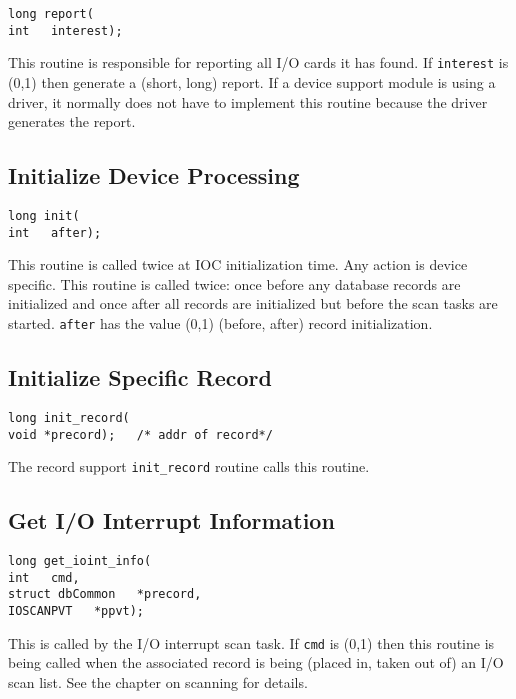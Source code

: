\begin{verbatim}long report(
int   interest);
\end{verbatim}This routine is responsible for reporting all I/O cards it has found. If \verb|interest| is (0,1) then generate a (short, long) 
report. If a device support module is using a driver, it normally does not have to implement this routine because the driver 
generates the report.

\subsection{Initialize Device Processing}

\begin{verbatim}long init(
int   after);
\end{verbatim}This routine is called twice at IOC initialization time. Any action is device specific. This routine is called twice: once 
before any database records are initialized and once after all records are initialized but before the scan tasks are started. 
\verb|after| has the value (0,1) (before, after) record initialization.

\subsection{Initialize Specific Record}

\begin{verbatim}long init_record(
void *precord);   /* addr of record*/
\end{verbatim}The record support \verb|init_record| routine calls this routine.

\subsection{Get I/O Interrupt Information}

\begin{verbatim}long get_ioint_info(
int   cmd,
struct dbCommon   *precord,
IOSCANPVT   *ppvt);
\end{verbatim}This is called by the I/O interrupt scan task. If \verb|cmd| is (0,1) then this routine is being called when the associated record is 
being (placed in, taken out of) an I/O scan list. See the chapter on scanning for details.

